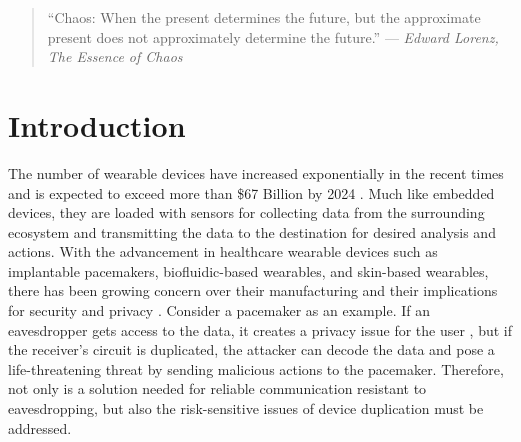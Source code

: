\begingroup
\RaggedRight

\begin{quote}
``Chaos: When the present determines the future, but the approximate present does not approximately determine the future.''
\newline
\hfill  — \textit{Edward Lorenz, The Essence of Chaos}
\end{quote}

\section*{Introduction}\label{sec1}
The number of wearable devices have increased exponentially in the recent times and is expected to exceed more than \$67 Billion by 2024 \cite{9214833}. Much like embedded devices, they are loaded with sensors for collecting data from the surrounding ecosystem and transmitting the data to the destination for desired analysis and actions. With the advancement in healthcare wearable devices \cite{wang2022cloud} such as implantable pacemakers, biofluidic-based wearables, and skin-based wearables, there has been growing concern over their manufacturing and their implications for security and privacy \cite{wen2021quantum}. Consider a pacemaker as an example. If an eavesdropper gets access to the data, it creates a privacy issue for the user \cite{al2022medical}, but if the receiver's circuit is duplicated, the attacker can decode the data and pose a life-threatening threat by sending malicious actions to the pacemaker. Therefore, not only is a solution needed for reliable communication resistant to eavesdropping, but also the risk-sensitive issues of device duplication must be addressed.  

